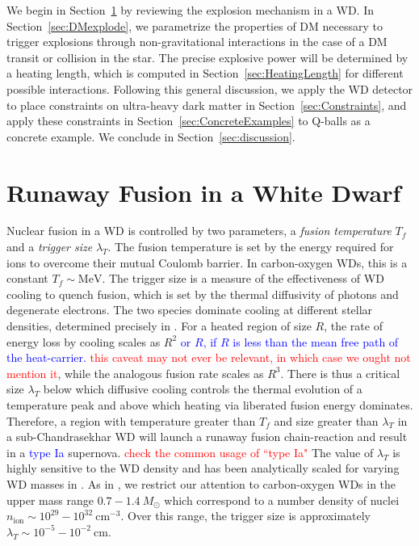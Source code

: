 \documentclass[twocolumn,showpacs,preprintnumbers,amsmath,amssymb,prd]{revtex4}
\newcommand{\MeV}{\text{MeV}}
\newcommand{\cm}{\text{cm}}
\begin{document}
We begin in Section~\ref{sec:Review} by reviewing the explosion mechanism in a WD. In Section~\ref{sec:DMexplode}, we parametrize the properties of DM necessary to trigger explosions through non-gravitational interactions in the case of a DM transit or collision in the star. The precise explosive power will be determined by a heating length, which is computed in Section~\ref{sec:HeatingLength} for different possible interactions. Following this general discussion, we apply the WD detector to place constraints on ultra-heavy dark matter in Section~\ref{sec:Constraints}, and apply these constraints in Section~\ref{sec:ConcreteExamples} to Q-balls as a concrete example. We conclude in Section~\ref{sec:discussion}.

\section{Runaway Fusion in a White Dwarf}
\label{sec:Review}

Nuclear fusion in a WD is controlled by two parameters, a \emph{fusion temperature} $T_f$ and a \emph{trigger size} $\lambda_T$.  The fusion temperature is set by the energy required for ions to overcome their mutual Coulomb barrier.  In carbon-oxygen WDs, this is a constant $T_f \sim \MeV$.  The trigger size is a measure of the effectiveness of WD cooling to quench fusion, which is set by the thermal diffusivity of photons and degenerate electrons. The two species dominate cooling at different stellar densities, determined precisely in \cite{Woosley}. For a heated region of size $R$, the rate of energy loss by cooling scales as $R^{2}$ \textcolor{blue}{or $R$, if $R$ is less than the mean free path of the heat-carrier.} \textcolor{red}{this caveat may not ever be relevant, in which case we ought not mention it}, while the analogous fusion rate scales as $R^{3}$.  There is thus a critical size $\lambda_T$ below which diffusive cooling controls the thermal evolution of a temperature peak and above which heating via liberated fusion energy dominates. Therefore, a region with temperature greater than $T_f$ and size greater than $\lambda_T$ in a sub-Chandrasekhar WD will launch a runaway fusion chain-reaction and result in a \textcolor{blue}{type Ia} supernova. \textcolor{red}{check the common usage of ``type Ia"}  The value of $\lambda_T$ is highly sensitive to the WD density and has been analytically scaled for varying WD masses in \cite{Graham:2015apa}. As in \cite{Graham:2015apa}, we restrict our attention to carbon-oxygen WDs in the upper mass range $0.7 - 1.4 ~M_{\odot}$ which correspond to a number density of nuclei $n_\text{ion} \sim 10^{29} - 10^{32} ~\cm^{-3}$. Over this range, the trigger size is approximately $\lambda_T \sim 10^{-5} - 10^{-2} ~\text{cm}$.
\end{document}
